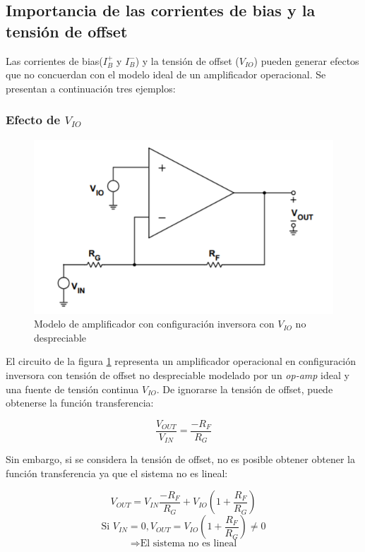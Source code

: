 \documentclass[../../main.tex]{subfiles}
\begin{document}
\subsection{Importancia de las corrientes de bias y la tensi\'on de offset}


Las corrientes de bias($I_B^+$ y $I_B^-$) y la tensi\'on de offset ($V_{IO}$) pueden generar efectos que no concuerdan con el modelo ideal de un amplificador operacional. Se presentan a continuaci\'on tres ejemplos:

\subsubsection*{Efecto de $V_{IO}$}

\begin{figure}[htb]	%
	\centering
	\includegraphics[height=0.2\textheight]{imagenes/vio_amplificacion.png}
	\caption{Modelo de amplificador con configuraci\'on inversora con $V_{IO}$ no despreciable}
	\label{fig:ej_3_efecto_vio}
\end{figure}

El circuito de la figura \ref{fig:ej_3_efecto_vio} representa un amplificador operacional en configuraci\'on inversora con tensi\'on de offset no despreciable modelado por un \textit{op-amp} ideal y una fuente de tensi\'on continua $V_{IO}$. De ignorarse la tensi\'on de offset, puede obtenerse la funci\'on transferencia:

\[\frac{V_{OUT}}{V_{IN}}=\frac{-R_F}{R_G}\]

Sin embargo, si se considera la tensi\'on de offset, no es posible obtener obtener la funci\'on transferencia ya que el sistema no es lineal:

\[V_{OUT}=V_{IN}\frac{-R_F}{R_G} + V_{IO}\left(1+\frac{R_F}{R_G}\right)\]
\[\text{Si }V_{IN} = 0,V_{OUT} = V_{IO}\left(1+\frac{R_F}{R_G}\right) \neq 0 \]
\[\Rightarrow \text{El sistema no es lineal}\]
\end{document}
